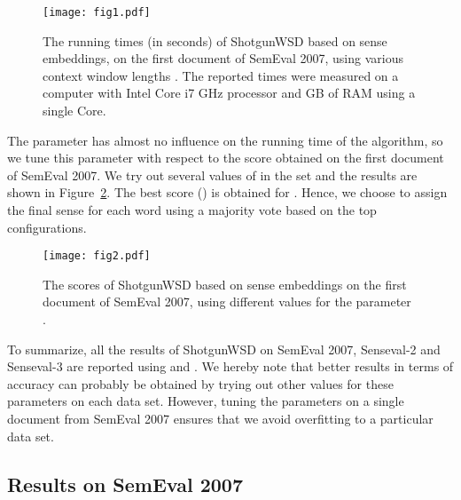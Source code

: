 \documentclass[11pt]{article}
\begin{document}
\begin{figure}
\begin{center}
\texttt{[image: fig1.pdf]}
\end{center}
\vspace*{-0.8em}
\caption{The running times (in seconds) of ShotgunWSD based on sense embeddings, on the first document of SemEval 2007, using various context window lengths . The reported times were measured on a computer with Intel Core i7  GHz processor and  GB of RAM using a single Core.}
\label{fig_tuning_n}
\vspace*{-0.4em}
\end{figure}

The parameter  has almost no influence on the running time of the algorithm, so we tune this parameter with respect to the  score obtained on the first document of SemEval 2007. We try out several values of  in the set  and the results are shown in Figure~\ref{fig_tuning_k}. The best  score () is obtained for . Hence, we choose to assign the final sense for each word using a majority vote based on the top  configurations. 

\begin{figure}
\begin{center}
\texttt{[image: fig2.pdf]}
\end{center}
\vspace*{-0.8em}
\caption{The  scores of ShotgunWSD based on sense embeddings on the first document of SemEval 2007, using different values for the parameter .}
\vspace*{-0.4em}
\label{fig_tuning_k}
\end{figure}

To summarize, all the results of ShotgunWSD on SemEval 2007, Senseval-2 and Senseval-3 are reported using  and . We hereby note that better results in terms of accuracy can probably be obtained by trying out other values for these parameters on each data set. However, tuning the parameters on a single document from SemEval 2007 ensures that we avoid overfitting to a particular data set.

\subsection{Results on SemEval 2007}
\end{document}
